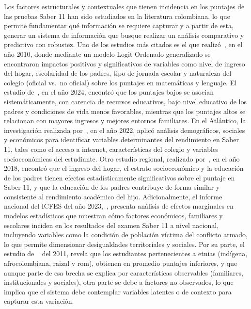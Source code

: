 Los factores estructurales y contextuales que tienen incidencia en los puntajes de las pruebas Saber 11 han sido estudiados en la literatura colombiana, lo que permite fundamentar qué información se requiere capturar y a partir de esta, generar un sistema de información que busque realizar un análisis comparativo y predictivo con robustez.
Uno de los estudios más citados es el que realizó~\cite{chica2010determinantes}, en el año 2010, donde mediante un modelo Logit Ordenado generalizado se encontraron impactos positivos y significativos de variables como nivel de ingreso del hogar, escolaridad de los padres, tipo de jornada escolar y naturaleza del colegio (oficial vs.\ no oficial) sobre los puntajes en matemáticas y lenguaje. El estudio de~\cite{arria2024estudio}, en el año 2024, encontró que los puntajes bajos se asocian sistemáticamente, con carencia de recursos educativos, bajo nivel educativo de los padres y condiciones de vida menos favorables, mientras que los puntajes altos se relacionan con mayores ingresos y mejores entornos familiares.
En el Atlántico, la investigación realizada por~\cite{lozanofactores}, en el año 2022, aplicó análisis demográficos, sociales y económicos para identificar variables determinantes del rendimiento en Saber 11, tales como el acceso a internet, características del colegio y variables socioeconómicas del estudiante. Otro estudio regional, realizado por~\cite{miranda2018ingreso}, en el año 2018, encontró que el ingreso del hogar, el estrato socioeconómico y la educación de los padres tienen efectos estadísticamente significativos sobre el puntaje en Saber 11, y que la educación de los padres contribuye de forma similar y consistente al rendimiento académico del hijo.
Adicionalmente, el informe nacional del ICFES del año 2023,~\cite{icfes2024_informeSaber11_2023}, presenta análisis de efectos marginales en modelos estadísticos que muestran cómo factores económicos, familiares y escolares inciden en los resultados del examen Saber 11 a nivel nacional, incluyendo variables como la condición de población víctima del conflicto armado, lo que permite dimensionar desigualdades territoriales y sociales.
Por su parte, el estudio de ~\cite{sanchez2011etnia} del 2011, revela que los estudiantes pertenecientes a etnias (indígena, afrocolombiana, raizal y rom), obtienen en promedio puntajes inferiores, y que aunque parte de esa brecha se explica por características observables (familiares, institucionales y sociales), otra parte se debe a factores no observados, lo que implica que el sistema debe contemplar variables latentes o de contexto para capturar esta variación.
